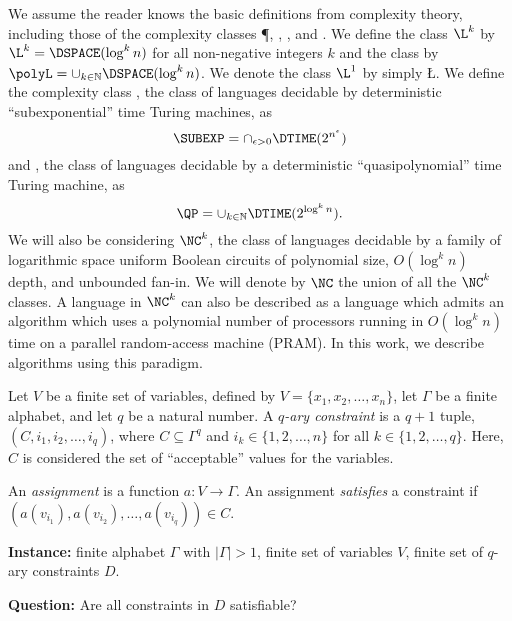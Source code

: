 \documentclass{article}
\begin{document}
We assume the reader knows the basic definitions from complexity theory, including those of the complexity classes \P, \NP, \DTIME, and \DSPACE.
We define the class $\L^k$ by $\L^k = \DSPACE(\log^k n)$ for all non-negative integers $k$ and the class \polyL{} by $\polyL = \cup_{k \in \mathbb{N}} \DSPACE(\log^k n)$.
We denote the class $\L^1$ by simply \L.
We define the complexity class \SUBEXP{}, the class of languages decidable by deterministic ``subexponential'' time Turing machines, as
\begin{equation*}
  \SUBEXP = \cap_{\epsilon > 0} \DTIME(2^{n^\epsilon})
\end{equation*}
and \QP{}, the class of languages decidable by a deterministic ``quasipolynomial'' time Turing machine, as
\begin{equation*}
  \QP = \cup_{k \in \mathbb{N}} \DTIME(2^{\log^k n}).
\end{equation*}
We will also be considering $\NC^k$, the class of languages decidable by a family of logarithmic space uniform Boolean circuits of polynomial size, $O(\log^k n)$ depth, and unbounded fan-in.
We will denote by $\NC$ the union of all the $\NC^k$ classes.
A language in $\NC^k$ can also be described as a language which admits an algorithm which uses a polynomial number of processors running in $O(\log^k n)$ time on a parallel random-access machine (PRAM).
In this work, we describe \NC{} algorithms using this paradigm.

\begin{definition}
  Let $V$ be a finite set of variables, defined by $V = \{x_1, x_2, \dotsc, x_n\}$, let $\Gamma$ be a finite alphabet, and let $q$ be a natural number.
  A \emph{$q$-ary constraint} is a $q + 1$ tuple, $(C, i_1, i_2, \dotsc, i_q)$, where $C \subseteq \Gamma^q$ and $i_k \in \{1, 2, \dotsc, n\}$ for all $k \in \{1, 2, \ldots, q\}$.
  Here, $C$ is considered the set of ``acceptable'' values for the variables.

  An \emph{assignment} is a function $a \colon V \to \Gamma$.
  An assignment \emph{satisfies} a constraint if $(a(v_{i_1}), a(v_{i_2}), \dotsc, a(v_{i_q})) \in C$.
\end{definition}

\begin{definition}
  \mbox{}

  \textbf{Instance:} finite alphabet $\Gamma$ with $|\Gamma| > 1$, finite set of variables $V$, finite set of $q$-ary constraints $D$.

  \textbf{Question:} Are all constraints in $D$ satisfiable?
\end{definition}
\end{document}
